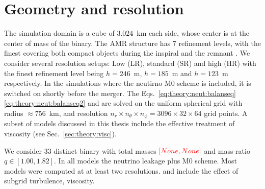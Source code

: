 \section{Geometry and resolution}

The simulation domain is a cube of $3.024$~km each side, 
whose center is at the center of mass of the binary.
The \ac{AMR} structure has $7$ refinement levels, with the finest 
covering both compact objects during the inspiral and the remnant \pmerg{}.
%
We consider several resolution setups: Low (LR), 
standard (SR) and high (HR) with the finest refinement level being 
$h=246$~m, $h=185$~m and $h=123$~m respectively.
%
In the simulations where the neutirno M0 scheme is included,
it is switched on shortly before the merger. 
The Eqs.~\eqref{eq:theory:neut:balanseq} \eqref{eq:theory:neut:balanseq2}
and are solved on the uniform spherical grid with radius $\approx 756$~km, 
and resolution $n_r\times n_{\theta}\times n_{\phi} = 3096 \times 32 \times 64$
grid points.
%
A subset of models discussed in this thesis include the effective treatment of viscosity
(see Sec.~\ref{sec:theory:visc}). 

We consider $33$ distinct binary with total masses 
$\textcolor{red}{[None,None]}$ and mass-ratio $q\in[1.00,1.82]$.
In all models the neutrino leakage plus M0 scheme. 
Most models were computed at at least two resolutions. 
and include the effect of subgrid turbulence, viscosity.

%
%
